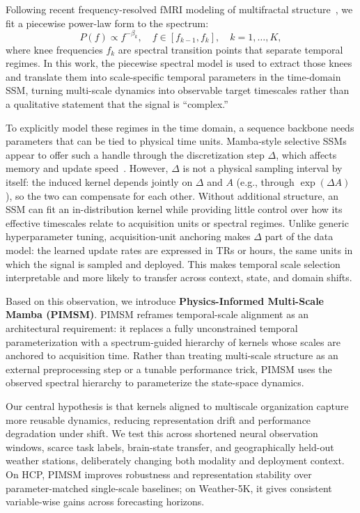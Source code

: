 \documentclass{article}
\begin{document}
Following recent frequency-resolved fMRI modeling of multifractal structure~\citep{bae2025spatiotemporal}, we fit a piecewise power-law form to the spectrum:
\begin{equation}
P(f) \propto f^{-\beta_k},
\quad f \in [f_{k-1}, f_k],
\quad k = 1, \dots, K,
\label{eq:piecewise_powerlaw}
\end{equation}
where knee frequencies $f_k$ are spectral transition points that separate temporal regimes. In this work, the piecewise spectral model is used to extract those knees and translate them into scale-specific temporal parameters in the time-domain SSM, turning multi-scale dynamics into observable target timescales rather than a qualitative statement that the signal is ``complex.''

To explicitly model these regimes in the time domain, a sequence backbone needs parameters that can be tied to physical time units. Mamba-style selective SSMs appear to offer such a handle through the discretization step $\Delta$, which affects memory and update speed~\citep{gu2023mamba}. However, $\Delta$ is not a physical sampling interval by itself: the induced kernel depends jointly on $\Delta$ and $A$ (e.g., through $\exp(\Delta A)$), so the two can compensate for each other. Without additional structure, an SSM can fit an in-distribution kernel while providing little control over how its effective timescales relate to acquisition units or spectral regimes.
Unlike generic hyperparameter tuning, acquisition-unit anchoring makes $\Delta$ part of the data model: the learned update rates are expressed in TRs or hours, the same units in which the signal is sampled and deployed. This makes temporal scale selection interpretable and more likely to transfer across context, state, and domain shifts.

Based on this observation, we introduce \textbf{Physics-Informed Multi-Scale Mamba (PIMSM)}. PIMSM reframes temporal-scale alignment as an architectural requirement: it replaces a fully unconstrained temporal parameterization with a spectrum-guided hierarchy of kernels whose scales are anchored to acquisition time. Rather than treating multi-scale structure as an external preprocessing step or a tunable performance trick, PIMSM uses the observed spectral hierarchy to parameterize the state-space dynamics.

Our central hypothesis is that kernels aligned to multiscale organization capture more reusable dynamics, reducing representation drift and performance degradation under shift. We test this across shortened neural observation windows, scarce task labels, brain-state transfer, and geographically held-out weather stations, deliberately changing both modality and deployment context. On HCP, PIMSM improves robustness and representation stability over parameter-matched single-scale baselines; on Weather-5K, it gives consistent variable-wise gains across forecasting horizons.
\end{document}
